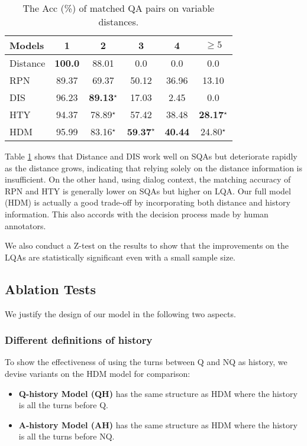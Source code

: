\begin{table}

	\centering
	\begin{tabular}{p{1.5cm}<{\centering}ccccc}
		\toprule[1.3pt]
		 Models &1&2&3&4&$\geq5$\\
		\midrule[1pt]
		Distance      &\textbf{100.0}&88.01&0.0&0.0&0.0 \\
		RPN  &89.37&69.37&50.12&36.96&13.10\\	
		DIS &96.23&\textbf{89.13}$^\star$&17.03&2.45&0.0\\
		HTY &94.37&78.89$^\star$&57.42&38.48&\textbf{28.17}$^\star$\\
		HDM &95.99&83.16$^\star$&$\textbf{59.37}^\star$&\textbf{40.44}&24.80$^\star$\\
		\bottomrule[1.3pt]
	\end{tabular}
	\vspace{-0.25cm}
	\caption{The Acc (\%) of matched QA pairs on variable distances.}
	\label{tab:longrangeResults}
\end{table}
Table \ref{tab:longrangeResults} shows that Distance and DIS work well on SQAs 
but deteriorate rapidly 
as the distance grows, indicating that relying solely on 
the distance information is insufficient. 
On the other hand, using dialog context, 
the matching accuracy of RPN and HTY is generally lower on SQAs but higher on 
LQA. Our full model (HDM) is actually a good trade-off 
by incorporating both distance and history information. This also accords 
with the decision process made by human annotators.

We also conduct a Z-test on the 
results to show that the improvements on the LQAs are statistically 
significant even with a small sample size.

\subsection{Ablation Tests}
We justify the design of our model in the following two aspects.

\subsubsection{Different definitions of history}

To show the effectiveness of using the turns between Q and NQ 
as history, we devise variants on the HDM model 
for comparison:
\begin{itemize}
	\item \textbf{Q-history Model (QH)} has the same structure as HDM where the history is all the turns before Q.
	\item \textbf{A-history Model (AH)} has the same structure as HDM where the history is all the turns before NQ. 

\end{itemize}


